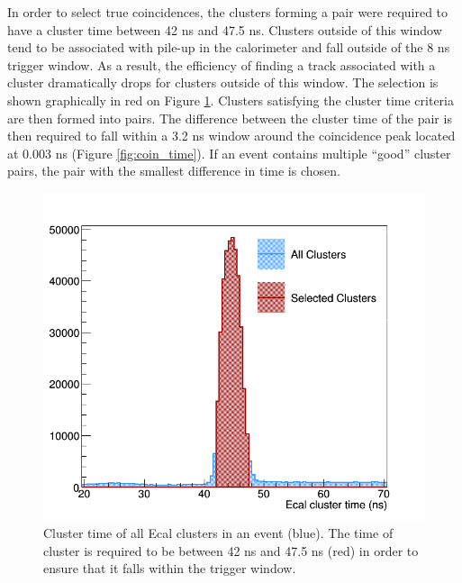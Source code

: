 In order to select true coincidences, the clusters forming a pair were 
required to have a cluster time between 42 ns and 47.5 ns.  Clusters outside 
of this window tend to be associated with pile-up in the calorimeter 
and fall outside of the 8 ns trigger window.  As a result, the efficiency of
finding a track associated with a cluster dramatically drops for clusters 
outside of this window. The selection is
shown graphically in red on Figure \ref{fig:cluster_times}.  Clusters satisfying
the cluster time criteria are then formed into pairs.  The difference between the
cluster time of the pair is then required to fall within a 3.2 ns window around the 
coincidence peak located at 0.003 ns (Figure \ref{fig:coin_time}).  If an event
contains multiple ``good'' cluster pairs, the pair with the smallest difference 
in time is chosen. 
\begin{figure}[ht]
    \centering
    \includegraphics[width=.9\textwidth]{images/20160428_ecal_cluster_time.png}
    \caption{Cluster time of all Ecal clusters in an event (blue). The time of 
             cluster is required to be between 42 ns and 47.5 ns (red) in order to 
             ensure that it falls within the trigger window.}
    \label{fig:cluster_times}
\end{figure}  

